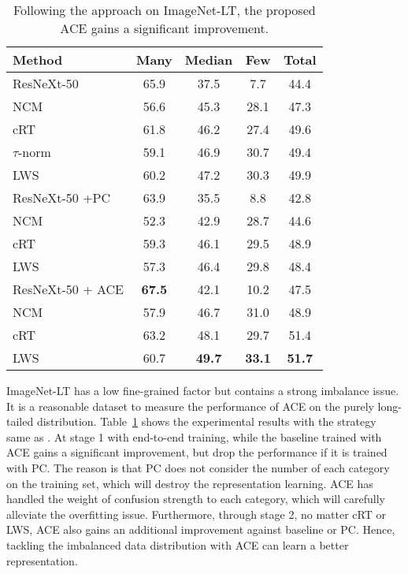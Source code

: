 \documentclass{article}
\begin{document}
\begin{table}[ht!]
    \centering
    \caption{Following the approach \cite{Kang2020Decoupling} on ImageNet-LT, the proposed ACE gains a significant improvement.}
    \label{tab:imagenet_lt}
    \begin{tabular}{lcccc}
        \toprule
        Method   & Many & Median & Few & Total \\
        \midrule
        \midrule
        ResNeXt-50 & 65.9	& 37.5	 & 7.7 & 44.4 \\
        \midrule
        NCM     & 56.6 & 45.3 & 28.1 & 47.3 \\
        cRT     & 61.8 & 46.2 & 27.4 & 49.6 \\
        $\tau$-norm & 59.1 & 46.9 & 30.7 & 49.4 \\
        LWS     & 60.2 & 47.2 & 30.3 & 49.9 \\
        \midrule
        \midrule
        ResNeXt-50 +PC & 63.9 & 35.5 & 8.8 & 42.8 \\
        \midrule
        NCM     & 52.3 & 42.9 & 28.7 & 44.6 \\
        cRT     & 59.3 & 46.1 & 29.5 & 48.9 \\
        LWS     & 57.3 & 46.4 & 29.8 & 48.4 \\
        \midrule
        \midrule
        ResNeXt-50 + ACE & \bf 67.5 & 42.1 & 10.2 & 47.5 \\
        \midrule
        NCM     & 57.9 & 46.7 & 31.0 & 48.9 \\
        cRT     & 63.2 & 48.1 & 29.7 & 51.4 \\
        LWS     & 60.7 & \bf 49.7 & \bf 33.1 & \bf 51.7 \\
        \bottomrule
    \end{tabular}
    \vspace{-10pt}
\end{table}

ImageNet-LT has a low fine-grained factor but contains a strong imbalance issue. It is a reasonable dataset to measure the performance of ACE on the purely long-tailed distribution. Table~\ref{tab:imagenet_lt} shows the experimental results with the strategy same as \cite{Kang2020Decoupling}. At stage 1 with end-to-end training, while the baseline trained with ACE gains a significant improvement, but drop the performance if it is trained with PC. The reason is that PC does not consider the number of each category on the training set, which will destroy the representation learning. ACE has handled the weight of confusion strength to each category, which will carefully alleviate the overfitting issue. Furthermore, through stage 2, no matter cRT or LWS, ACE also gains an additional improvement against baseline or PC. Hence, tackling the imbalanced data distribution with ACE can learn a better representation.
\end{document}
